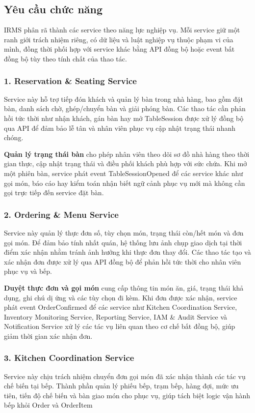 \subsection{Yêu cầu chức năng}
IRMS phân rã thành các service theo năng lực nghiệp vụ. Mỗi service giữ một ranh giới trách nhiệm riêng, có dữ liệu và luật nghiệp vụ thuộc phạm vi của mình, đồng thời phối hợp với service khác bằng API đồng bộ hoặc event bất đồng bộ tùy theo tính chất của thao tác.

\subsubsection*{1. \textsf{Reservation \& Seating Service}}
Service này hỗ trợ tiếp đón khách và quản lý bàn trong nhà hàng, bao gồm đặt bàn, danh sách chờ, ghép/chuyển bàn và giải phóng bàn. Các thao tác cần phản hồi tức thời như nhận khách, gán bàn hay mở \textsf{TableSession} được xử lý đồng bộ qua API để đảm bảo lễ tân và nhân viên phục vụ cập nhật trạng thái nhanh chóng.

\textbf{Quản lý trạng thái bàn} cho phép nhân viên theo dõi sơ đồ nhà hàng theo thời gian thực, cập nhật trạng thái và điều phối khách phù hợp với sức chứa. Khi mở một phiên bàn, service phát event \textsf{TableSessionOpened} để các service khác như gọi món, báo cáo hay kiểm toán nhận biết ngữ cảnh phục vụ mới mà không cần gọi trực tiếp đến service đặt bàn.

\subsubsection*{2. \textsf{Ordering \& Menu Service}}
Service này quản lý thực đơn số, tùy chọn món, trạng thái còn/hết món và đơn gọi món. Để đảm bảo tính nhất quán, hệ thống lưu ảnh chụp giao dịch tại thời điểm xác nhận nhằm tránh ảnh hưởng khi thực đơn thay đổi. Các thao tác tạo và xác nhận đơn được xử lý qua API đồng bộ để phản hồi tức thời cho nhân viên phục vụ và bếp.

\textbf{Duyệt thực đơn và gọi món} cung cấp thông tin món ăn, giá, trạng thái khả dụng, ghi chú dị ứng và các tùy chọn đi kèm. Khi đơn được xác nhận, service phát event \textsf{OrderConfirmed} để các service như \textsf{Kitchen Coordination Service}, \textsf{Inventory Monitoring Service}, \textsf{Reporting Service}, \textsf{IAM \& Audit Service} và \textsf{Notification Service} xử lý các tác vụ liên quan theo cơ chế bất đồng bộ, giúp giảm thời gian xác nhận đơn.

\subsubsection*{3. \textsf{Kitchen Coordination Service}}
Service này chịu trách nhiệm chuyển đơn gọi món đã xác nhận thành các tác vụ chế biến tại bếp. Thành phần quản lý phiếu bếp, trạm bếp, hàng đợi, mức ưu tiên, tiến độ chế biến và bàn giao món cho phục vụ, giúp tách biệt logic vận hành bếp khỏi \textsf{Order} và \textsf{OrderItem}

